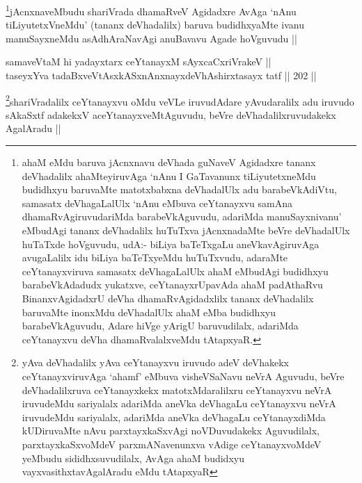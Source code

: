 \begin{artha}
\footnote{ahaM eMdu baruva jAcnxnavu deVhada guNaveV Agidadxre tananx deVhadalilx ahaMteyiruvAga `nAnu I GaTavanunx tiLiyutetxneMdu budidhxyu baruvaMte matotxbabxna deVhadalUlx adu barabeVkAdiVtu, samasatx deVhagaLalUlx `nAnu eMbuva ceYtanayxvu samAna dhamaRvAgiruvudariMda barabeVkAguvudu, adariMda manuSayxnivanu' eMbudAgi tananx deVhadalilx huTuTxva jAcnxnadaMte beVre deVhadalUlx huTaTxde hoVguvudu, udA:- biLiya baTeTxgaLu aneVkavAgiruvAga avugaLalilx idu biLiya baTeTxyeMdu huTuTxvudu, adaraMte ceYtanayxviruva samasatx deVhagaLalUlx ahaM eMbudAgi budidhxyu barabeVkAdadudx yukatxve, ceYtanayxrUpavAda ahaM padAthaRvu BinanxvAgidadxrU deVha dhamaRvAgidadxlilx tananx deVhadalilx baruvaMte inonxMdu deVhadalUlx ahaM eMba budidhxyu barabeVkAguvudu, Adare hiVge yArigU baruvudilalx, adariMda ceYtanayxvu deVha dhamaRvalalxveMdu tAtapxyaR.}jAcnxnaveMbudu shariVrada dhamaRveV Agidadxre AvAga `nAnu tiLiyutetxVneMdu' (tananx deVhadalilx) baruva budidhxyaMte ivanu manuSayxneMdu asAdhAraNavAgi anuBavavu Agade hoVguvudu || 
\end{artha}


\begin{shl}
samaveVtaM hi yadayxtarx ceYtanayxM sAyxcaCxriVrakeV || \\
taseyxYva tadaBxveVtAsxkASxnAnxnayxdeVhAshirxtasayx tatf ||  202 ||  
\end{shl}

\begin{artha}
\footnote{yAva deVhadalilx yAva ceYtanayxvu iruvudo adeV deVhakekx ceYtanayxviruvAga `ahamf' eMbuva visheVSaNavu neVrA Aguvudu, beVre deVhadalilxruva ceYtanayxkekx matotxMdaralilxru ceYtanayxvu neVrA iruvudeMdu sariyalalx adariMda aneVka deVhagaLu ceYtanayxvu neVrA iruvudeMdu sariyalalx, adariMda aneVka deVhagaLu ceYtanayxdiMda kUDiruvaMte nAvu parxtayxkaSxvAgi noVDuvudakekx Aguvudilalx, parxtayxkaSxvoMdeV parxmANavenunxva vAdige ceYtanayxvoMdeV yeMbudu sididhxsuvudilalx, AvAga ahaM budidxyu vayxvasithxtavAgalAradu eMdu tAtapxyaR}shariVradalilx ceYtanayxvu oMdu veVLe iruvudAdare yAvudaralilx adu iruvudo sAkaSxtf adakekxV aceYtanayxveMtAguvudu, beVre deVhadalilxruvudakekx AgalAradu ||
\end{artha}


